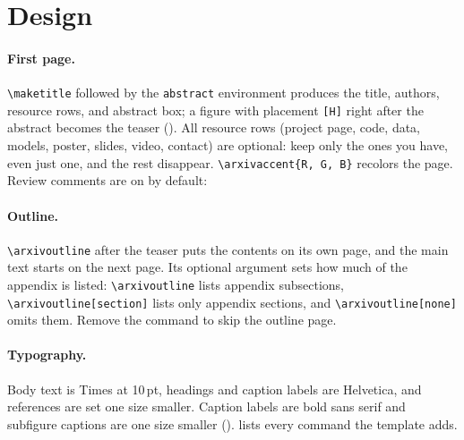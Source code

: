\section{Design}

\paragraph{First page.} \texttt{\textbackslash maketitle} followed by the \texttt{abstract} environment produces the title, authors, resource rows, and abstract box; a figure with placement \texttt{[H]} right after the abstract becomes the teaser (). All resource rows (project page, code, data, models, poster, slides, video, contact) are optional: keep only the ones you have, even just one, and the rest disappear. \texttt{\textbackslash arxivaccent\{R, G, B\}} recolors the page. Review comments are on by default:    

\paragraph{Outline.} \texttt{\textbackslash arxivoutline} after the teaser puts the contents on its own page, and the main text starts on the next page. Its optional argument sets how much of the appendix is listed: \texttt{\textbackslash arxivoutline} lists appendix subsections, \texttt{\textbackslash arxivoutline[section]} lists only appendix sections, and \texttt{\textbackslash arxivoutline[none]} omits them. Remove the command to skip the outline page.

\paragraph{Typography.} Body text is Times at 10\,pt, headings and caption labels are Helvetica, and references are set one size smaller. Caption labels are bold sans serif and subfigure captions are one size smaller ().  lists every command the template adds.

